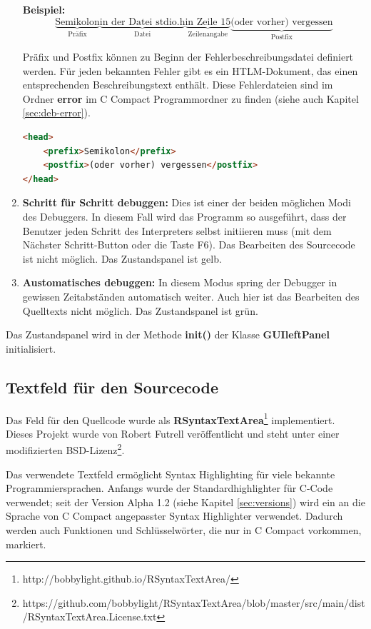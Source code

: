 \begin{enumerate}
\textbf{Beispiel:}
\[
\underbrace{\text{Semikolon}}_{\text{Präfix}} \underbrace{\text{in der Datei stdio.h}}_{\text{Datei}} \underbrace{\text{in Zeile 15}}_{\text{Zeilenangabe}} \underbrace{\text{(oder vorher) vergessen}}_{\text{Postfix}}
\]

Präfix und Postfix können zu Beginn der Fehlerbeschreibungsdatei definiert werden. Für jeden bekannten Fehler gibt es ein HTLM-Dokument, das einen entsprechenden Beschreibungstext enthält. Diese Fehlerdateien sind im Ordner \textbf{error} im C Compact Programmordner zu finden (siehe auch Kapitel \ref{sec:deb-error}).

\begin{lstlisting}[language=HTML]
<head>
	<prefix>Semikolon</prefix>
	<postfix>(oder vorher) vergessen</postfix>
</head>
\end{lstlisting}

\item \textbf{Schritt für Schritt debuggen:} Dies ist einer der beiden möglichen Modi des Debuggers. In diesem Fall wird das Programm so ausgeführt, dass der Benutzer jeden Schritt des Interpreters selbst initiieren muss (mit dem \glqq{}Nächster Schritt\grqq{}-Button oder die Taste F6). Das Bearbeiten des Sourcecode ist nicht möglich. Das Zustandspanel ist gelb.

\item \textbf{Austomatisches debuggen:} In diesem Modus spring der Debugger  in gewissen Zeitabständen automatisch weiter. Auch hier ist das Bearbeiten des Quelltexts nicht möglich. Das Zustandspanel ist grün.
\end{enumerate}

Das Zustandspanel wird in der Methode \textbf{init()} der Klasse \textbf{GUIleftPanel} initialisiert.

\subsection{Textfeld für den Sourcecode}
\label{sec:gui-main-left-code}
Das Feld für den Quellcode wurde als \textbf{RSyntaxTextArea}\footnote{http://bobbylight.github.io/RSyntaxTextArea/} implementiert. Dieses Projekt wurde von Robert Futrell veröffentlicht und steht unter einer modifizierten BSD-Lizenz\footnote{https://github.com/bobbylight/RSyntaxTextArea/blob/master/src/main/dist/RSyntaxTextArea.License.txt}.

Das verwendete Textfeld ermöglicht Syntax Highlighting für viele bekannte Programmiersprachen. Anfangs wurde der Standardhighlighter für C-Code verwendet; seit der Version Alpha 1.2 (siehe Kapitel \ref{sec:versions}) wird ein an die Sprache von C Compact angepasster Syntax Highlighter verwendet. Dadurch werden auch Funktionen und Schlüsselwörter, die nur in C Compact vorkommen, markiert.

